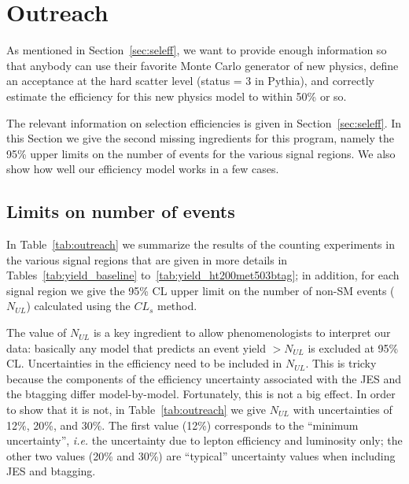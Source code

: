 

\section{Outreach}
\label{sec:outreach}
As mentioned in Section~\ref{sec:seleff}, we want to provide 
enough information so that anybody can use their favorite Monte Carlo
generator of new physics, define an acceptance at the hard 
scatter level (status = 3 in Pythia), and correctly estimate
the efficiency for this new physics model to within 50\% or so.

The relevant information on selection efficiencies is 
given in Section~\ref{sec:seleff}.  In this Section we give the 
second missing ingredients for this program, namely the 
95\% upper limits on the number of events for the various 
signal regions.  We also show how well our efficiency model 
works in a few cases.

\subsection{Limits on number of events}
\label{sec:outreachlimits}
In Table~\ref{tab:outreach} we summarize the 
results of the counting experiments in the various signal 
regions that are given in more 
details in Tables~\ref{tab:yield_baseline} 
to~\ref{tab:yield_ht200met503btag}; in addition, for each signal 
region we give the 95\% CL upper limit on the number of 
non-SM events ($N_{UL}$) calculated using the $CL_s$ method.

The value of $N_{UL}$ is a key ingredient to allow phenomenologists
to interpret our data: basically any model that predicts an 
event yield $> N_{UL}$ is excluded at 95\% CL.  Uncertainties 
in the efficiency need to be included in $N_{UL}$.  This is tricky 
because the components of the efficiency uncertainty associated 
with the JES and the btagging differ model-by-model.  Fortunately,
this is not a big effect.  In order to show that it is not, in 
Table~\ref{tab:outreach} we give $N_{UL}$ with uncertainties of 
12\%, 20\%, and 30\%. The first value (12\%) corresponds to the 
``minimum uncertainty'', {\em i.e.} the uncertainty due to 
lepton efficiency and luminosity only; the other two values (20\%
and 30\%) are ``typical'' uncertainty values when including
JES and btagging.

